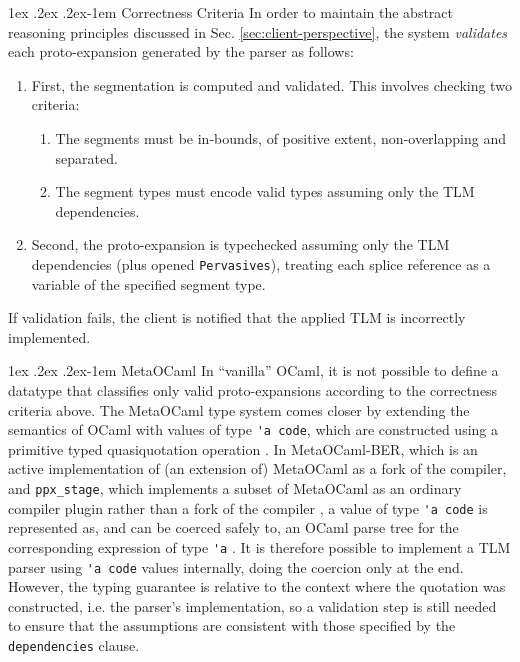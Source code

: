 \documentclass[acmsmall]{acmart}
\makeatletter
\renewcommand{\subsubsection}{%
  \@startsection{subsubsection}{3}%
  {\z@}{1ex \@plus .2ex \@minus .2ex}{-1em}%
  {\normalfont\normalsize\bfseries}%
}
\newcommand{\li}[1]{\lstinline[basicstyle=\ttfamily\fontsize{9pt}{1em}\selectfont]{#1}}
\makeatother
\begin{document}
\subsubsection{Correctness Criteria}
\label{sec:correctness-criteria}
In order to maintain the abstract reasoning principles discussed in Sec. \ref{sec:client-perspective}, the system \emph{validates} each proto-expansion generated by the parser as follows:
\begin{enumerate}
  \item First, the segmentation is computed and validated. This involves checking two criteria:
    \begin{enumerate}
      \item The segments must be in-bounds, of positive extent, non-overlapping and separated.
      \item The segment types must encode valid types assuming only the TLM dependencies.
    \end{enumerate}
  \item Second, the proto-expansion is typechecked assuming only the TLM dependencies (plus opened \li{Pervasives}), treating each splice reference as a variable of the specified segment type.
\end{enumerate}
If validation fails, the client is notified that the applied TLM is incorrectly implemented.%

\subsubsection{MetaOCaml}\label{sec:metaocaml} In ``vanilla'' OCaml, it is not possible to define a datatype that classifies only valid proto-expansions according to the correctness criteria above. The MetaOCaml type system comes closer by extending the semantics of OCaml with values of type \li{'a code}, which are constructed using a primitive typed quasiquotation operation \cite{DBLP:conf/flops/Kiselyov14,taha2004gentle}. In MetaOCaml-BER, which is an active implementation of (an extension of) MetaOCaml as a fork of the compiler, and \li{ppx_stage}, which implements a subset of MetaOCaml as an ordinary compiler plugin rather than a fork of the compiler \cite{ppxstage}, a value of type \li{'a code} is represented as, and can be coerced safely to, an OCaml parse tree for the corresponding expression of type \li{'a} \cite{DBLP:conf/flops/Kiselyov14}. It is therefore possible to implement a TLM parser using \li{'a code} values internally, doing the coercion only at the end. However, the typing guarantee is relative to the context where the quotation was constructed, i.e. the parser's implementation, so a validation step is still needed to ensure that the assumptions are consistent with those specified by the \li{dependencies} clause. 
\end{document}
